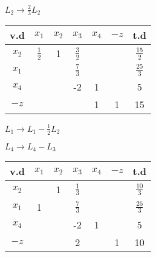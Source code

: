 \begin{center}
$L_2 \to \frac{2}{3}L_2$

\renewcommand{\arraystretch}{1.5}
\begin{tabular}{|c|ccccc|c|}
	\hline
 v.d  &     $x_1$     & $x_2$ &     $x_3$     & $x_4$ & $-z$ &      t.d       \\ \hline
	$x_2$ & $\frac{1}{2}$ &   1   & $\frac{3}{2}$ &       &      & $\frac{15}{2}$ \\
	$x_1$ &  \Circled{1}  &       & $\frac{7}{3}$ &       &      & $\frac{25}{3}$ \\
	$x_4$ &               &       &      -2       &   1   &      &       5        \\ \hline
	$-z$  &               &       &               &   1   &  1   &       15       \\ \hline
\end{tabular}

$L_1 \to L_1 - \frac{1}{2}L_2$

$L_4 \to L_4 - L_3$

\renewcommand{\arraystretch}{1.5}
\begin{tabular}{|c|ccccc|c|}
	\hline
v.d  & $x_1$ & $x_2$ &     $x_3$     & $x_4$ & $-z$ &      t.d       \\ \hline
	$x_2$ &       &   1   & $\frac{1}{3}$ &       &      & $\frac{10}{3}$ \\
	$x_1$ &   1   &       & $\frac{7}{3}$ &       &      & $\frac{25}{3}$ \\
	$x_4$ &       &       &      -2       &   1   &      &       5        \\ \hline
	$-z$  &       &       &       2       &       &  1   &       10       \\ \hline
\end{tabular}
	
\end{center}
